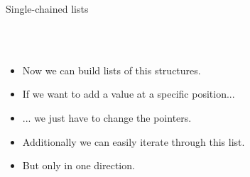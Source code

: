 \begin{frame}{Single-chained lists}
\begin{tikzpicture}[scale=.73,font=\scriptsize]
		
	\end{tikzpicture}
	\ \\\ \\
	\begin{itemize}[<+->]
		\item Now we can build lists of this structures.
		\item If we want to add a value at a specific position...
		\item ... we just have to change the pointers.
	\end{itemize}
	
	\begin{itemize}
		\item<6-> Additionally we can easily iterate through this list.
		\item<6-> But only in one direction.
	\end{itemize}
	
\end{frame}

